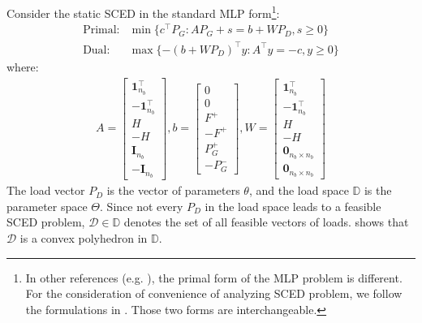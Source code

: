 \documentclass[letterpaper, 11pt]{article}
\theoremstyle{plain}
\theoremstyle{definition}
\begin{document}
Consider the static SCED in the standard MLP form\footnote{In other references (e.g. \cite{Adler1992a, Gal1972}), the primal form of the MLP problem is different. For the consideration of convenience of analyzing SCED problem, we follow the formulations in \cite{Borrelli2003}. Those two forms are interchangeable.}:
\begin{subequations}
\label{eqn:SCED_MLP_Primal}
\begin{align}
  \text{Primal:} & \min\{c^\intercal P_G: AP_G + s = b + WP_D, s\ge 0\} \\
  \label{eqn:SCED_MLP_Dual}
  \text{Dual:} &\max\{-(b+WP_D)^\intercal y: A^\intercal y=-c, y\ge 0\} 
\end{align}
\end{subequations}
where:
\begin{eqnarray}
\label{eqn:details_of_the_A_W_b}
  A = 
  \begin{bmatrix}
     \mathbf{1}_{n_b}^\intercal  \\ -\mathbf{1}_{n_b}^\intercal  \\
    H\\ - H\\
    \mathbf{I}_{n_b} \\
    -\mathbf{I}_{n_b}
  \end{bmatrix},
      b = 
  \begin{bmatrix}
    0 \\0  \\ F^+ \\ -F^+ \\ P_G^+ \\ -P_G^-
  \end{bmatrix},
  W = 
  \begin{bmatrix}
    \mathbf{1}_{n_b}^\intercal \\
    -\mathbf{1}_{n_b}^\intercal\\ 
    H \\ -H \\
    \mathbf{0}_{n_b \times n_b} \\ \mathbf{0}_{n_b \times n_b}
  \end{bmatrix}
\end{eqnarray}
The load vector $P_D$ is the vector of parameters $\theta$, and the load space $\mathbb{D}$ is the parameter space $\Theta$. Since not every $P_D$ in the load space leads to a feasible SCED problem, $\mathcal{D} \in \mathbb{D}$  denotes the set of all feasible vectors of loads. \cite{Gal1972} shows that $\mathcal{D}$ is a convex polyhedron in $\mathbb{D}$.
\end{document}
